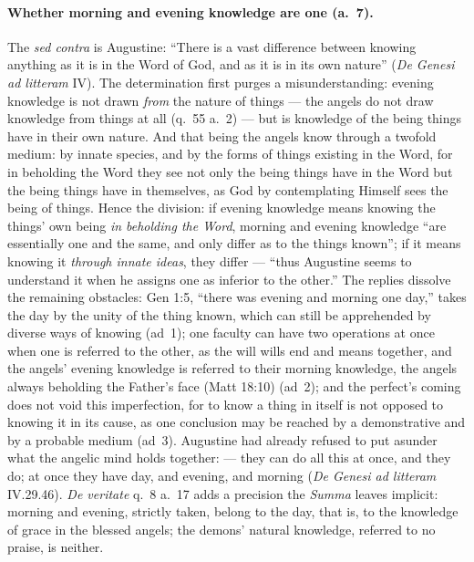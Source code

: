 \paragraph{Whether morning and evening knowledge are one (a.~7).} The
\emph{sed contra} is Augustine: ``There is a vast difference between
knowing anything as it is in the Word of God, and as it is in its own
nature'' (\emph{De Genesi ad litteram} IV). The determination first purges
a misunderstanding: evening knowledge is not drawn \emph{from} the nature
of things --- the angels do not draw knowledge from things at all (q.~55
a.~2) --- but is knowledge of the being things have in their own nature.
And that being the angels know through a twofold medium: by innate
species, and by the forms of things existing in the Word, for in beholding
the Word they see not only the being things have in the Word but the being
things have in themselves, as God by contemplating Himself sees the being
of things. Hence the division: if evening knowledge means knowing the
things' own being \emph{in beholding the Word}, morning and evening
knowledge ``are essentially one and the same, and only differ as to the
things known''; if it means knowing it \emph{through innate ideas}, they
differ --- ``thus Augustine seems to understand it when he assigns one as
inferior to the other.'' The replies dissolve the remaining obstacles:
Gen 1:5, ``there was evening and morning one day,'' takes the day by the
unity of the thing known, which can still be apprehended by diverse ways
of knowing (ad~1); one faculty can have two operations at once when one is
referred to the other, as the will wills end and means together, and the
angels' evening knowledge is referred to their morning knowledge, the
angels always beholding the Father's face (Matt 18:10) (ad~2); and the
perfect's coming does not void this imperfection, for to know a thing in
itself is not opposed to knowing it in its cause, as one conclusion may be
reached by a demonstrative and by a probable medium (ad~3). Augustine had
already refused to put asunder what the angelic mind holds together:
 --- they can do all this at once,
and they do; at once they have day, and evening, and morning (\emph{De
Genesi ad litteram} IV.29.46). \emph{De veritate} q.~8 a.~17 adds a
precision the \emph{Summa} leaves implicit: morning and evening, strictly
taken, belong to the day, that is, to the knowledge of grace in the
blessed angels; the demons' natural knowledge, referred to no praise, is
neither.

